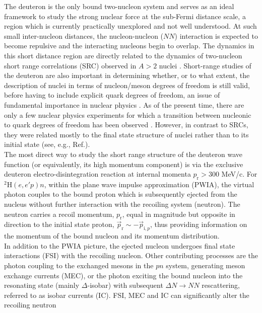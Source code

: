 \documentclass[aps,prl,twocolumn,showpacs,superscriptaddress,groupedaddress,nofootinbib]{revtex4-2}  %
\begin{document}
The deuteron is the only bound two-nucleon system and serves as an ideal framework to study the strong nuclear force at the sub-Fermi distance scale, a region which is currently
practically unexplored and not well understood. At such small inter-nucleon distances, the nucleon-nucleon ($NN$) interaction is expected to become repulsive and the interacting
nucleons begin to overlap. The dynamics in this short distance region are directly related to the dynamics of two-nucleon short range correlations (SRC) observed in $A>2$ nuclei \cite{PhysRevC.68.014313,PhysRevLett.96.082501,PhysRevLett.99.072501,Fomin_2017,Hen2014,RevModPhys.89.045002}.
Short-range studies of the deuteron are also important in determining whether, or to what extent, the description of nuclei in terms of nucleon/meson degrees of freedom is still valid, before
having to include explicit quark degrees of freedom, an issue of fundamental importance in nuclear physics \cite{sargsian_2015}. As of the present time, there are only a few nuclear physics experiments for
which a transition between nucleonic to quark degrees of freedom has been observed \cite{PhysRevLett.81.4576,PhysRevLett.87.102302,PhysRevC.66.042201}.
However, in contrast to SRCs, they were related mostly to the final state structure of nuclei rather than to its initial state (see, e.g., Ref.\cite{PhysRevLett.84.3045}).\\
\indent The most direct way to study the short range structure of the deuteron wave function (or equivalently, its high momentum component) is via the exclusive deuteron
electro-disintegration reaction at internal momenta $p_{\mathrm{r}}>300$ MeV/c. For $^{2}\mathrm{H}(e,e'p)n$, within the plane wave impulse approximation (PWIA), the virtual photon couples to
the bound proton which is subsequently ejected from the nucleus without further interaction with the recoiling system (neutron). The neutron carries a recoil momentum, $p_{\mathrm{r}}$, equal in magnitude but opposite in direction
to the initial state proton, $\vec{p}_{\mathrm{r}} \sim -\vec{p}_{\mathrm{i},p}$, thus providing information on the momentum of the bound nucleon and its momentum distribution.\\
\indent In addition to the PWIA picture, the ejected nucleon undergoes final state interactions (FSI) with the recoiling nucleon. Other contributing processes are
the photon coupling to the exchanged mesons in the $pn$ system, generating meson exchange currents (MEC), or the photon exciting the bound nucleon into the
resonating state (mainly $\Delta$-isobar) with subsequent $\Delta N \to NN$ rescattering, referred to as isobar currents (IC). FSI, MEC and IC can significantly alter the recoiling neutron
\end{document}
